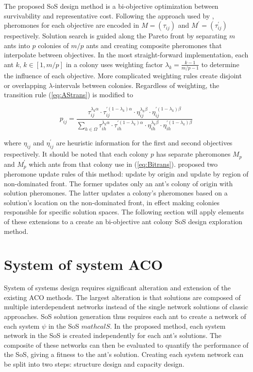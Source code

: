 \documentclass[preprint,12pt,authoryear]{elsarticle}
\begin{document}
The proposed SoS design method is a bi-objective optimization between survivability and representative cost. Following the approach used by \cite{Iredi2001}, pheromones for each objective are encoded in $M=(\tau_{ij})$ and $M^{'}=(\tau_{ij}^{'})$ respectively. Solution search is guided along the Pareto front by separating $m$ ants into $p$ colonies of $m/p$ ants and creating composite pheromones that interpolate between objectives. In the most straight-forward implementation, each ant $k$, $k \in [1,m/p]$ in a colony uses weighting factor $\lambda_{k}=\frac{k-1}{m/p-1}$ to determine the influence of each objective. More complicated weighting rules create disjoint or overlapping $\lambda$-intervals between colonies. Regardless of weighting, the transition rule (\ref{eq:AStrans}) is modified to

\begin{equation}
p_{ij}=\frac{\tau_{ij}^{\lambda_k\alpha}\cdot\tau_{ij}^{'(1-\lambda_k)\alpha}\cdot\eta_{ij}^{\lambda_k\beta}\cdot\eta_{ij}^{'(1-\lambda_k)\beta}}{\sum_{h\in\Omega}\tau_{ih}^{\lambda_k\alpha}\cdot\tau_{ih}^{'(1-\lambda_k)\alpha}\cdot\eta_{ih}^{\lambda_k\beta}\cdot\eta_{ih}^{'(1-\lambda_k)\beta}}
\label{eq:Bitrans}
\end{equation}

\noindent where $\eta_{ij}$ and $\eta^{'}_{ij}$ are heuristic information for the first and second objectives respectively. It should be noted that each colony $p$ has separate pheromones $M_p$ and $M^{'}_p$ which ants from that colony use in (\ref{eq:Bitrans}). \cite{Iredi2001} proposed two pheromone update rules of this method: update by origin and update by region of non-dominated front. The former updates only an ant's colony of origin with solution pheromones. The latter updates a colony's pheromones based on a solution's location on the non-dominated front, in effect making colonies responsible for specific solution spaces. The following section will apply elements of these extensions to a create an bi-objective ant colony SoS design exploration method.


\section{System of system ACO}
System of systems design requires significant alteration and extension of the existing ACO methods. The largest alteration is that solutions are composed of multiple interdependent networks instead of the single network solutions of classic approaches. SoS solution generation thus requires each ant to create a network of each system $\psi$ in the SoS $mathcal{S}$. In the proposed method, each system network in the SoS is created independently for each ant's solutions. The composite of these networks can then be evaluated to quantify the performance of the SoS, giving a fitness to the ant's solution. Creating each system network can be split into two steps: structure design and capacity design. 
\end{document}
